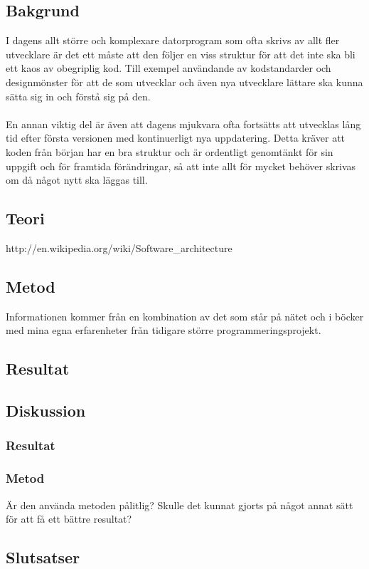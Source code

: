 \subsection{Bakgrund}
I dagens allt större och komplexare datorprogram som ofta skrivs av allt fler utvecklare är det ett måste att den följer en viss struktur för att det inte ska bli ett kaos av obegriplig kod. Till exempel användande av kodstandarder och designmönster för att de som utvecklar och även nya utvecklare lättare ska kunna sätta sig in och förstå sig på den.
\\\\
En annan viktig del är även att dagens mjukvara ofta fortsätts att utvecklas lång tid efter första versionen med kontinuerligt nya uppdatering. Detta kräver att koden från början har en bra struktur och är ordentligt genomtänkt för sin uppgift och för framtida förändringar, så att inte allt för mycket behöver skrivas om då något nytt ska läggas till.
\subsection{Teori}
http://en.wikipedia.org/wiki/Software\_architecture
\subsection{Metod}
Informationen kommer från en kombination av det som står på nätet och i böcker med mina egna erfarenheter från tidigare större programmeringsprojekt.
\subsection{Resultat}
\subsection{Diskussion}
\subsubsection{Resultat}
\subsubsection{Metod}
Är den använda metoden pålitlig? Skulle det kunnat gjorts på något annat sätt för att få ett bättre resultat?
\subsection{Slutsatser}
